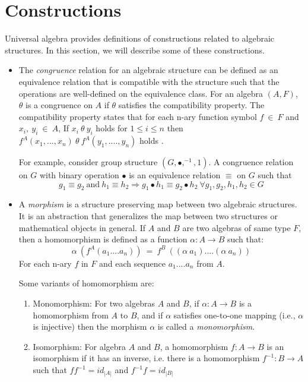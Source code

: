 \section{Constructions}
\label{construct}
Universal algebra provides definitions of constructions related to algebraic
structures. In this section, we will describe some of these constructions. 
\begin{itemize}
    \item The \textit{congruence} relation for an algebraic structure can be
    defined as an equivalence relation that is compatible with the structure
    such that the operations are well-defined on the equivalence class. For an
    algebra $(A,F)$, $\theta$ is a congruence on $A$ if $\theta$ satisfies the
    compatibility property. The compatibility property states that for each
    n-ary function symbol $f \ \in\ F$ and $x_i,\ y_i\ \in\ A$, If $x_i\ \theta\
    y_i$ holds for \(1\leq i \leq n\) then $f^{A}(x_1,...,x_n)\ \theta\
    f^{A}(y_1,....,y_n)$ holds \cite{sankappanavar1981course}.

    For example, consider group structure $(G, ∙, ^{-1}, 1)$. A
    congruence relation on $G$ with binary operation $∙$ is an equivalence
    relation $\equiv$ on $G$ such that \[g_1\equiv g_2\ \text{and}\ h_1 \equiv h_2
    \Rightarrow g_1 ∙ h_1 \equiv g_2 ∙ h_2\ \forall g_1,g_2,h_1,h_2 \in G\] 
    
    \item A \textit{morphism} is a structure preserving map between two
    algebraic structures. It is an abstraction that generalizes the map between
    two structures or mathematical objects in general. If $A$ and $B$ are two
    algebras of same type $F$, then a homomorphism is defined as a function
    $\alpha: A \rightarrow B$ such that: \[ \alpha\ (f^{A}(a_1....a_n))\ =\
    f^{B}\ ((\alpha\ a_1)....(\alpha\ a_n))\] For each n-ary $f$ in $F$ and
    each sequence $a_1....a_n$ from $A$.

    Some variants of homomorphism are:
    \begin{enumerate}
        \item  Monomorphism: For two algebras $A$ and $B$, if \(\alpha : A
        \rightarrow B \) is a homomorphism from $A$ to $B$, and if \(\alpha\)
        satisfies one-to-one mapping (i.e., \(\alpha\) is injective) then the
        morphism \(\alpha\) is called a \textit{monomorphism}.

        \item Isomorphism: For algebra $A$ and $B$, a homomorphism $f:A → B$ is
        an isomorphism if it has an inverse, i.e. there is a homomorphism
        $f^{-1}:B → A$ such that $ff^{-1} =
        id_{|A|}$ and $f^{-1}f = id_{|B|}$ 


\end{enumerate}
\end{itemize}
